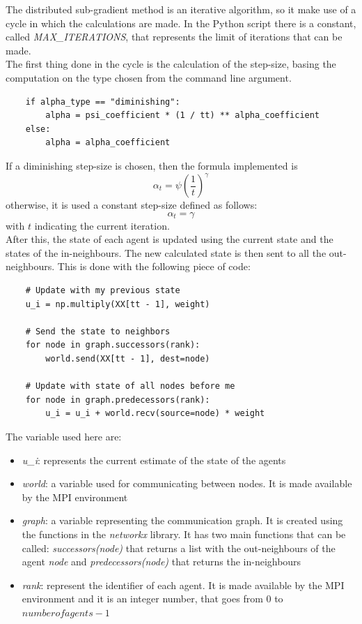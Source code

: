 \documentclass[a4paper,11pt,oneside]{book}
\begin{document}
The distributed sub-gradient method is an iterative algorithm, so it make use of a cycle in which the calculations are made. In the Python script there is a constant, called \textit{MAX\_ITERATIONS}, that represents the limit of iterations that can be made. \\
The first thing done in the cycle is the calculation of the step-size, basing the computation on the type chosen from the command line argument.

\begin{lstlisting}
    if alpha_type == "diminishing":
        alpha = psi_coefficient * (1 / tt) ** alpha_coefficient
    else:
        alpha = alpha_coefficient
\end{lstlisting}
If a diminishing step-size is chosen, then the formula implemented is
\begin{equation}
	\alpha_t = \psi \left( \dfrac{1}{t} \right)^\gamma
\end{equation}
otherwise, it is used a constant step-size defined as follows:
\begin{equation}
	\alpha_t = \gamma
\end{equation}
with $t$ indicating the current iteration. \\

After this, the state of each agent is updated using the current state and the states of the in-neighbours. The new calculated state is then sent to all the out-neighbours. This is done with the following piece of code:
\begin{lstlisting}
    # Update with my previous state
    u_i = np.multiply(XX[tt - 1], weight)

    # Send the state to neighbors
    for node in graph.successors(rank):
        world.send(XX[tt - 1], dest=node)

    # Update with state of all nodes before me
    for node in graph.predecessors(rank):
        u_i = u_i + world.recv(source=node) * weight
\end{lstlisting}

The variable used here are:
\begin{itemize}
	\item  \textit{u\_i}: represents the current estimate of the state of the agents
	\item \textit{world}: a variable used for communicating between nodes. It is made available by the MPI environment
	\item \textit{graph}: a variable representing the communication graph. It is created using the functions in the \textit{networkx} library. It has two main functions that can be called: \textit{successors(node)} that returns a list with the out-neighbours of the agent \textit{node} and \textit{predecessors(node)} that returns the in-neighbours
	\item \textit{rank}: represent the identifier of each agent. It is made available by the MPI environment and it is an integer number, that goes from $0$ to $number of agents - 1$
\end{itemize}
\end{document}
